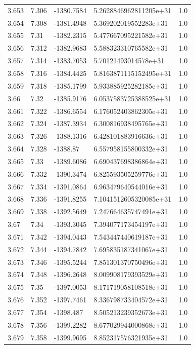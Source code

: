 \begin{tabular}{lllll}
3.653 & 7.306 & -1380.7584 & 5.2628846962811205e+31 & 1.0 \\
3.654 & 7.308 & -1381.4948 & 5.369202019552283e+31 & 1.0 \\
3.655 & 7.31 & -1382.2315 & 5.477667095221582e+31 & 1.0 \\
3.656 & 7.312 & -1382.9683 & 5.588323310765582e+31 & 1.0 \\
3.657 & 7.314 & -1383.7053 & 5.70121493014578e+31 & 1.0 \\
3.658 & 7.316 & -1384.4425 & 5.8163871115152495e+31 & 1.0 \\
3.659 & 7.318 & -1385.1799 & 5.933885925282185e+31 & 1.0 \\
3.66 & 7.32 & -1385.9176 & 6.0537583725388525e+31 & 1.0 \\
3.661 & 7.322 & -1386.6554 & 6.176052403862305e+31 & 1.0 \\
3.662 & 7.324 & -1387.3934 & 6.300816938495765e+31 & 1.0 \\
3.663 & 7.326 & -1388.1316 & 6.428101883916636e+31 & 1.0 \\
3.664 & 7.328 & -1388.87 & 6.557958155800332e+31 & 1.0 \\
3.665 & 7.33 & -1389.6086 & 6.690437698386864e+31 & 1.0 \\
3.666 & 7.332 & -1390.3474 & 6.825593505259776e+31 & 1.0 \\
3.667 & 7.334 & -1391.0864 & 6.963479640544016e+31 & 1.0 \\
3.668 & 7.336 & -1391.8255 & 7.1041512605320085e+31 & 1.0 \\
3.669 & 7.338 & -1392.5649 & 7.247664635747491e+31 & 1.0 \\
3.67 & 7.34 & -1393.3045 & 7.394077173454197e+31 & 1.0 \\
3.671 & 7.342 & -1394.0443 & 7.543447440619187e+31 & 1.0 \\
3.672 & 7.344 & -1394.7842 & 7.695835187341067e+31 & 1.0 \\
3.673 & 7.346 & -1395.5244 & 7.851301370750496e+31 & 1.0 \\
3.674 & 7.348 & -1396.2648 & 8.009908179393529e+31 & 1.0 \\
3.675 & 7.35 & -1397.0053 & 8.171719058108518e+31 & 1.0 \\
3.676 & 7.352 & -1397.7461 & 8.336798733404572e+31 & 1.0 \\
3.677 & 7.354 & -1398.487 & 8.505213239352673e+31 & 1.0 \\
3.678 & 7.356 & -1399.2282 & 8.677029944000868e+31 & 1.0 \\
3.679 & 7.358 & -1399.9695 & 8.852317576321935e+31 & 1.0 \\

\end{tabular}
